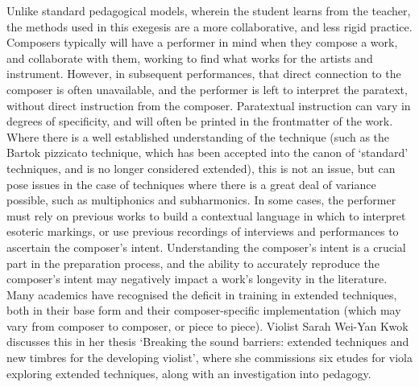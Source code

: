 Unlike standard pedagogical models, wherein the student learns from the teacher, the methods used in this exegesis are a more collaborative, and less rigid practice.
Composers typically will have a performer in mind when they compose a work, and collaborate with them, working to find what works for the artists and instrument.
However, in subsequent performances, that direct connection to the composer is often unavailable, and the performer is left to interpret the paratext, without direct instruction from the composer.
Paratextual instruction can vary in degrees of specificity, and will often be printed in the frontmatter of the work.
Where there is a well established understanding of the technique (such as the Bartok pizzicato technique, which has been accepted into the canon of `standard' techniques, and is no longer considered extended), this is not an issue, but can pose issues in the case of techniques where there is a great deal of variance possible, such as multiphonics and subharmonics.
In some cases, the performer must rely on previous works to build a contextual language in which to interpret esoteric markings, or use previous recordings of interviews and performances to ascertain the composer's intent.
Understanding the composer's intent is a crucial part in the preparation process, and the ability to accurately reproduce the composer's intent may negatively impact a work's longevity in the literature.
Many academics have recognised the deficit in training in extended techniques, both in their base form and their composer-specific implementation (which may vary from composer to composer, or piece to piece). 
Violist Sarah Wei-Yan Kwok discusses this in her thesis `Breaking the sound barriers: extended techniques and new timbres for the developing violist', where she commissions six etudes for viola exploring extended techniques, along with an investigation into pedagogy.\autocite{kwokBreakingSoundBarriers2018}

